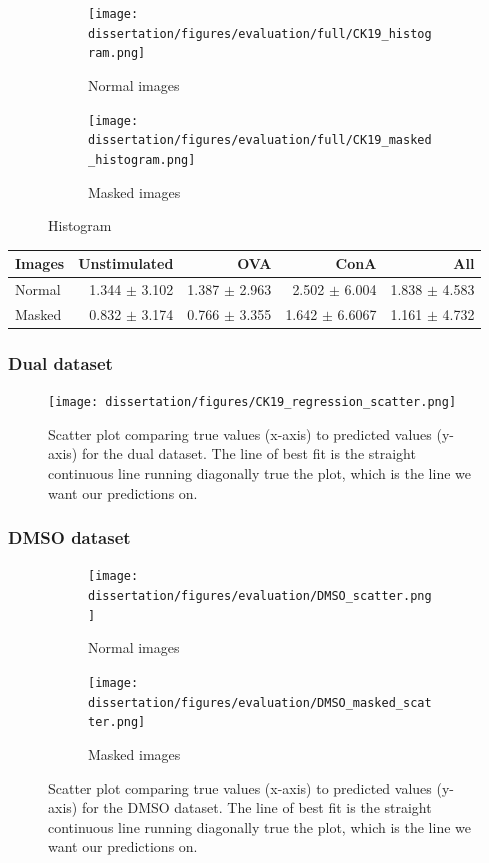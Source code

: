 \begin{figure}[h!]
    \centering
    \begin{subfigure}{0.45\textwidth}
        \texttt{[image: dissertation/figures/evaluation/full/CK19\_histogram.png]}
        \caption{Normal images}
    \end{subfigure}
    \begin{subfigure}{0.45\textwidth}
        \texttt{[image: dissertation/figures/evaluation/full/CK19\_masked\_histogram.png]}
        \caption{Masked images}
    \end{subfigure}
    \caption{Histogram}
\end{figure}

\begin{table}[h!]
\centering
\begin{tabular}{l|rrr|r}
\rowcolor[HTML]{EFEFEF}
Images & Unstimulated & OVA & ConA & All \\ \hline
Normal      & 1.344 $\pm$ 3.102  & 1.387 $\pm$ 2.963   & 2.502 $\pm$ 6.004  &   1.838 $\pm$ 4.583  \\ \hline
Masked      &    0.832 $\pm$ 3.174          & 0.766 $\pm$ 3.355  &  1.642 $\pm$ 6.6067   &   1.161 $\pm$ 4.732
\end{tabular}
\end{table}

\bigskip
\subsubsection{Dual dataset}
\hfill
\hfill

\begin{figure}[h!]
    \centering
    \texttt{[image: dissertation/figures/CK19\_regression\_scatter.png]}
    \caption{Scatter plot comparing true values (x-axis) to predicted values (y-axis) for the dual dataset. The line of best fit is the straight continuous line running diagonally true the plot, which is the line we want our predictions on.}
    \label{fig:full_scatter}
\end{figure}

\bigskip
\subsubsection{DMSO dataset}
\hfill
\hfill

\begin{figure}[h!]
    \centering
    \begin{subfigure}{0.45\textwidth}
        \texttt{[image: dissertation/figures/evaluation/DMSO\_scatter.png]}
        \caption{Normal images}
    \end{subfigure}
    \begin{subfigure}{0.45\textwidth}
        \texttt{[image: dissertation/figures/evaluation/DMSO\_masked\_scatter.png]}
        \caption{Masked images}
    \end{subfigure}
    \caption{Scatter plot comparing true values (x-axis) to predicted values (y-axis) for the DMSO dataset. The line of best fit is the straight continuous line running diagonally true the plot, which is the line we want our predictions on.}
    \label{fig:dmso_scatter}
\end{figure}

